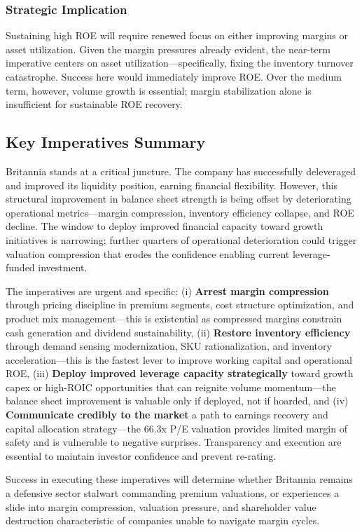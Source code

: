 \documentclass[12pt, a4paper]{report}
\begin{document}
\subsubsection{Strategic Implication}
Sustaining high ROE will require renewed focus on either improving margins or asset utilization. Given the margin pressures already evident, the near-term imperative centers on asset utilization—specifically, fixing the inventory turnover catastrophe. Success here would immediately improve ROE. Over the medium term, however, volume growth is essential; margin stabilization alone is insufficient for sustainable ROE recovery.

\subsection{Key Imperatives Summary}

Britannia stands at a critical juncture. The company has successfully deleveraged and improved its liquidity position, earning financial flexibility. However, this structural improvement in balance sheet strength is being offset by deteriorating operational metrics—margin compression, inventory efficiency collapse, and ROE decline. The window to deploy improved financial capacity toward growth initiatives is narrowing; further quarters of operational deterioration could trigger valuation compression that erodes the confidence enabling current leverage-funded investment.

The imperatives are urgent and specific: (i) \textbf{Arrest margin compression} through pricing discipline in premium segments, cost structure optimization, and product mix management—this is existential as compressed margins constrain cash generation and dividend sustainability, (ii) \textbf{Restore inventory efficiency} through demand sensing modernization, SKU rationalization, and inventory acceleration—this is the fastest lever to improve working capital and operational ROE, (iii) \textbf{Deploy improved leverage capacity strategically} toward growth capex or high-ROIC opportunities that can reignite volume momentum—the balance sheet improvement is valuable only if deployed, not if hoarded, and (iv) \textbf{Communicate credibly to the market} a path to earnings recovery and capital allocation strategy—the 66.3x P/E valuation provides limited margin of safety and is vulnerable to negative surprises. Transparency and execution are essential to maintain investor confidence and prevent re-rating.

Success in executing these imperatives will determine whether Britannia remains a defensive sector stalwart commanding premium valuations, or experiences a slide into margin compression, valuation pressure, and shareholder value destruction characteristic of companies unable to navigate margin cycles.
\end{document}
